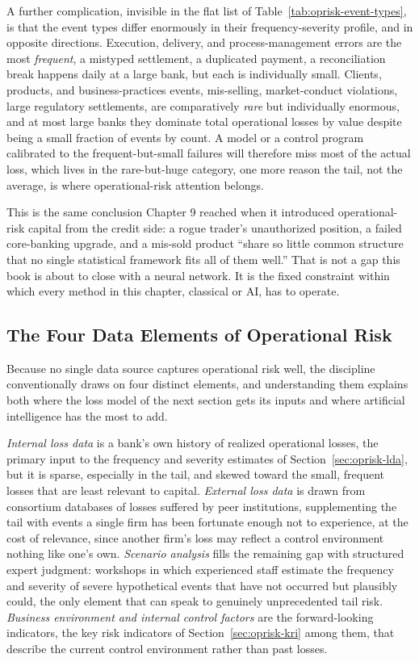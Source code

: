 \documentclass[../ai_in_finance]{subfiles}
\begin{document}
A further complication, invisible in the flat list of Table~\ref{tab:oprisk-event-types}, is that the event types differ enormously in their frequency-severity profile, and in opposite directions. Execution, delivery, and process-management errors are the most \emph{frequent}, a mistyped settlement, a duplicated payment, a reconciliation break happens daily at a large bank, but each is individually small. Clients, products, and business-practices events, mis-selling, market-conduct violations, large regulatory settlements, are comparatively \emph{rare} but individually enormous, and at most large banks they dominate total operational losses by value despite being a small fraction of events by count. A model or a control program calibrated to the frequent-but-small failures will therefore miss most of the actual loss, which lives in the rare-but-huge category, one more reason the tail, not the average, is where operational-risk attention belongs.

This is the same conclusion Chapter 9 reached when it introduced operational-risk capital from the credit side: a rogue trader's unauthorized position, a failed core-banking upgrade, and a mis-sold product ``share so little common structure that no single statistical framework fits all of them well.'' That is not a gap this book is about to close with a neural network. It is the fixed constraint within which every method in this chapter, classical or AI, has to operate.

\subsection{The Four Data Elements of Operational Risk}
\label{sec:oprisk-data}

Because no single data source captures operational risk well, the discipline conventionally draws on four distinct elements, and understanding them explains both where the loss model of the next section gets its inputs and where artificial intelligence has the most to add.

\emph{Internal loss data} is a bank's own history of realized operational losses, the primary input to the frequency and severity estimates of Section~\ref{sec:oprisk-lda}, but it is sparse, especially in the tail, and skewed toward the small, frequent losses that are least relevant to capital. \emph{External loss data} is drawn from consortium databases of losses suffered by peer institutions, supplementing the tail with events a single firm has been fortunate enough not to experience, at the cost of relevance, since another firm's loss may reflect a control environment nothing like one's own. \emph{Scenario analysis} fills the remaining gap with structured expert judgment: workshops in which experienced staff estimate the frequency and severity of severe hypothetical events that have not occurred but plausibly could, the only element that can speak to genuinely unprecedented tail risk. \emph{Business environment and internal control factors} are the forward-looking indicators, the key risk indicators of Section~\ref{sec:oprisk-kri} among them, that describe the current control environment rather than past losses.
\end{document}
